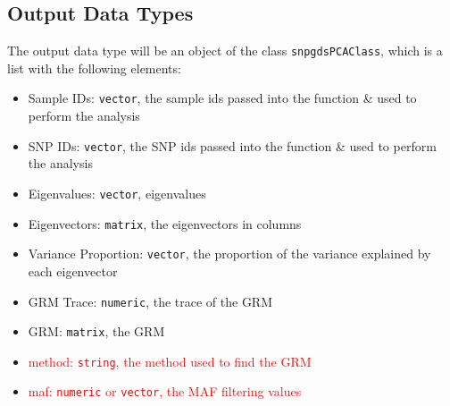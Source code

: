 \documentclass[11pt]{article}
\newcommand{\note}[1]{{\sf\textcolor{red}{#1}}}
\begin{document}
\subsection{Output Data Types}
\label{output-var}
The output data type will be an object of the class \texttt{snpgdsPCAClass}, which is a list with the following elements:
\begin{itemize}
\item Sample IDs: \texttt{vector}, the sample ids passed into the function \& used to perform the analysis
\item SNP IDs: \texttt{vector}, the SNP ids passed into the function \& used to perform the analysis
\item Eigenvalues: \texttt{vector}, eigenvalues
\item Eigenvectors: \texttt{matrix}, the eigenvectors in columns
\item Variance Proportion: \texttt{vector}, the proportion of the variance explained by each eigenvector
\item GRM Trace: \texttt{numeric}, the trace of the GRM
\item GRM: \texttt{matrix}, the GRM
\item \note{method: \texttt{string}, the method used to find the GRM}\
\item \note{maf: \texttt{numeric} or \texttt{vector}, the MAF filtering values}
\end{itemize}
\end{document}

